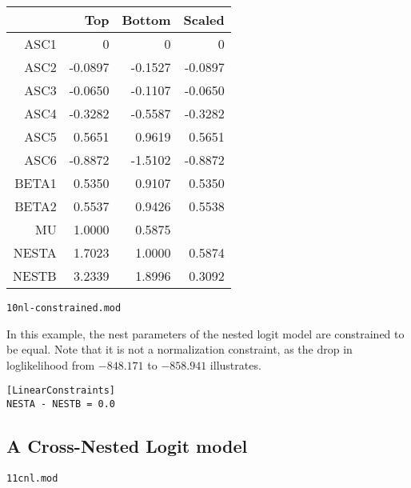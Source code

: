 \documentclass[12pt]{memoir}
\begin{document}
\begin{center}
\begin{tabular}{rrrr}
\hline
           &        Top &     Bottom &     Scaled \\
\hline
      ASC1 &          0 &          0 &          0 \\

      ASC2 &    -0.0897 &    -0.1527 &    -0.0897 \\

      ASC3 &    -0.0650 &    -0.1107 &    -0.0650 \\

      ASC4 &    -0.3282 &    -0.5587 &    -0.3282 \\

      ASC5 &     0.5651 &     0.9619 &     0.5651 \\

      ASC6 &    -0.8872 &    -1.5102 &    -0.8872 \\

     BETA1 &     0.5350 &     0.9107 &     0.5350 \\

     BETA2 &     0.5537 &     0.9426 &     0.5538 \\
\hline
        MU &     1.0000 &     0.5875 &            \\

     NESTA &     1.7023 &     1.0000 &    0.5874  \\

     NESTB &     3.2339 &     1.8996 &    0.3092  \\
\hline
\end{tabular} 
\end{center} 

\begin{flushright}
\verb+10nl-constrained.mod+
\end{flushright}

In this example, the nest parameters of the nested logit model are
constrained to be equal. Note that it is not a normalization
constraint, as the drop in loglikelihood from $-848.171$ to $-858.941$
illustrates.

{\footnotesize
\begin{verbatim}
[LinearConstraints]
NESTA - NESTB = 0.0
\end{verbatim}
}

\subsection{A Cross-Nested Logit model}
\begin{flushright}
\verb+11cnl.mod+
\end{flushright}
\end{document}
